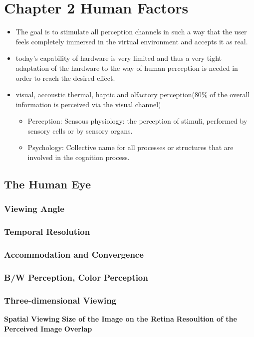 \documentclass{standalone}
\begin{document}
\section{Chapter 2 Human Factors}
\begin{itemize}
	\item The goal is to stimulate all perception channels in such a way that the user feels completely immersed in the virtual environment and accepts it as real.
	\item today's capability of hardware is very limited and thus a very tight adaptation of the hardware to the way of human perception is needed in order to reach the desired effect.
	\item visual, accoustic thermal, haptic and olfactory perception($80 \%$ of the overall information is perceived via the visual channel)
	\begin{itemize}
		\item Perception: Sensous physiology: the perception of stimuli, performed by sensory cells or by sensory organs.
		\item Psychology: Collective name for all processes or structures that are involved in the cognition process.
	\end{itemize}
\end{itemize}
\subsection{The Human Eye}

\subsubsection{Viewing Angle}
\subsubsection{Temporal Resolution}

\subsubsection{Accommodation and Convergence}

\subsubsection{B/W Perception, Color Perception}
\subsubsection{Three-dimensional Viewing}

\textbf{Spatial Viewing}
\textbf{Size of the Image on the Retina}
\textbf{Resoultion of the Perceived Image}
\textbf{Overlap}
\end{document}
